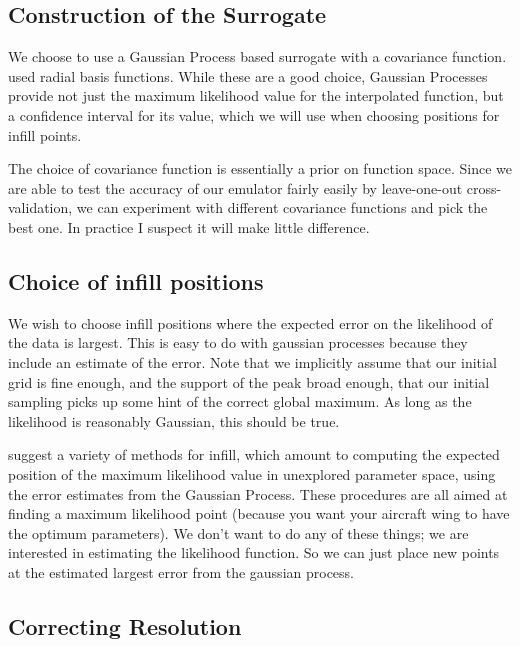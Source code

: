 \documentclass[10pt, aps, prd]{revtex4-1}
\begin{document}
\subsection{Construction of the Surrogate}

We choose to use a Gaussian Process based surrogate with a covariance function. \cite{Liu:2015} used 
radial basis functions. While these are a good choice, Gaussian Processes provide not just the maximum 
likelihood value for the interpolated function, but a confidence interval for its value, which we 
will use when choosing positions for infill points.

The choice of covariance function is essentially a prior on function space. Since we are able to test 
the accuracy of our emulator fairly easily by leave-one-out cross-validation, we can experiment with different
covariance functions and pick the best one. In practice I suspect it will make little difference.

\subsection{Choice of infill positions}

We wish to choose infill positions where the expected error on the likelihood of the data is largest. This is easy to do with 
gaussian processes because they include an estimate of the error. Note that we implicitly assume that our initial grid 
is fine enough, and the support of the peak broad enough, that our initial sampling picks 
up some hint of the correct global maximum. As long as the likelihood is reasonably Gaussian, this should be true.

\cite{forrester2009recent} suggest a variety of methods for infill, which amount to computing the expected position of the maximum likelihood value 
in unexplored parameter space, using the error estimates from the Gaussian Process. These procedures are all aimed at finding a maximum likelihood 
point (because you want your aircraft wing to have the optimum parameters). We don't want to do any of these things; we are interested in 
estimating the likelihood function. So we can just place new points at the estimated largest error from the gaussian process.

\subsection{Correcting Resolution}
\end{document}
